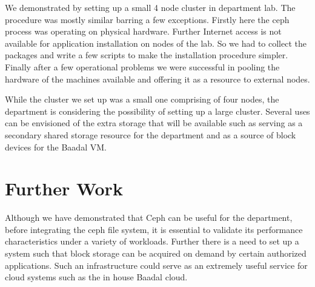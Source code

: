 \documentclass[a4paper,10pt]{article}
\begin{document}
    We demonstrated by setting up a small 4 node cluster in department lab. The procedure was mostly similar barring a few exceptions. Firstly here the ceph process was operating on physical hardware. Further Internet access is not available for application installation on nodes of the lab. So we had to collect the packages and write a few scripts to make the installation procedure simpler. Finally after a few operational problems we were successful in pooling the hardware of the machines available and offering it as a resource to external nodes.
    
    While the cluster we set up was a small one comprising of four nodes, the department is considering the possibility of setting up a large cluster. Several uses can be envisioned of the extra storage that will be available such as serving as a secondary shared storage resource for the department and as a source of block devices for the Baadal VM. 
    

    

\section{Further Work}

Although we have demonstrated that Ceph can be useful for the department, before integrating the ceph file system, it is essential to validate its performance characteristics under a variety of workloads. Further there is a need to set up a system such that block storage can be acquired on demand by certain authorized applications. Such an infrastructure could serve as an extremely useful service for cloud systems such as the in house Baadal cloud.


\newpage
\medskip


\end{document}
